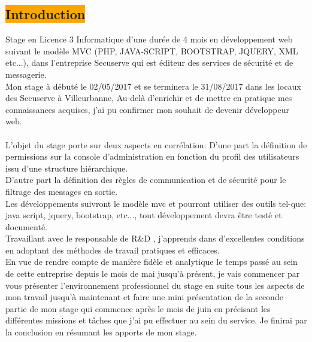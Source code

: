 

\begin{center}
\section{ \colorbox{orange}{Introduction}}
\end{center}
\begin{spacing}{1.3}
Stage en Licence 3 Informatique d’une durée de 4 mois en développement web suivant le modèle MVC (PHP, JAVA-SCRIPT, BOOTSTRAP, JQUERY, XML etc...), dans l'entreprise Secuserve qui est éditeur des services de sécurité et de messagerie.\\
Mon stage à débuté le 02/05/2017 et se terminera le 31/08/2017 dans les locaux des Secuserve à Villeurbanne, Au-delà d'enrichir et de mettre en pratique mes connaissances acquises, j'ai pu confirmer mon souhait de devenir développeur web.\\ \\
L'objet du stage porte sur deux aspects en corrélation:
D'une part la définition de permissions sur la console d'administration en fonction du profil des utilisateurs issu d'une structure hiérarchique.\\
D'autre part la définition des règles de communication et de sécurité pour le filtrage des messages en sortie.\\
Les développements suivront le modèle mvc et pourront utiliser des outils tel-que: java script, jquery, bootstrap, etc..., tout développement devra être testé et documenté.\\
Travaillant avec le responsable de R\&D , j'apprends dans d'excellentes conditions en adoptant des méthodes de travail pratiques et efficaces.  \\

En vue de rendre compte de manière fidèle et analytique le temps passé au sein de cette entreprise depuis le mois de mai jusqu'à présent, je vais commencer par vous présenter l'environnement professionnel du stage en suite tous les aspects de mon travail jusqu'à maintenant et faire une mini présentation de la seconde partie de mon stage qui commence après le mois de juin en précisant les différentes missions et tâches que j'ai pu effectuer au sein du service. Je finirai par la conclusion  en résumant les apports de mon stage.
\end{spacing}
